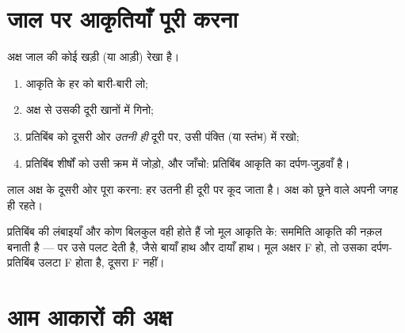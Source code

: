 \section{जाल पर आकृतियाँ पूरी करना}

\begin{method}[जाल की रेखा पर सममित आकृति]\label{met:g4:symmetry:grid}
अक्ष जाल की कोई खड़ी (या आड़ी) रेखा है।
\begin{enumerate}
  \item आकृति के हर  को बारी-बारी लो;
  \item अक्ष से उसकी दूरी खानों में गिनो;
  \item प्रतिबिंब  को दूसरी ओर \emph{उतनी ही} दूरी पर,
        उसी पंक्ति (या स्तंभ) में रखो;
  \item प्रतिबिंब शीर्षों को उसी क्रम में जोड़ो, और जाँचो:
        प्रतिबिंब आकृति का दर्पण-जुड़वाँ है।
\end{enumerate}
\end{method}

\begin{omfigure}

{\small लाल अक्ष के दूसरी ओर पूरा करना: हर  उतनी ही दूरी पर
कूद जाता है। अक्ष को छूने वाले  अपनी जगह ही रहते।}
\end{omfigure}

\begin{example}[वही आकार, वही नाप, पर पलटा हुआ]\label{ex:g4:symmetry:properties}
प्रतिबिंब की लंबाइयाँ और कोण बिलकुल वही होते हैं जो मूल आकृति
के: सममिति आकृति की नक़ल बनाती है --- पर उसे पलट देती है, जैसे
बायाँ हाथ और दायाँ हाथ। मूल अक्षर F हो, तो उसका
दर्पण-प्रतिबिंब उलटा F होता है, दूसरा F नहीं।
\end{example}

\section{आम आकारों की अक्ष}


